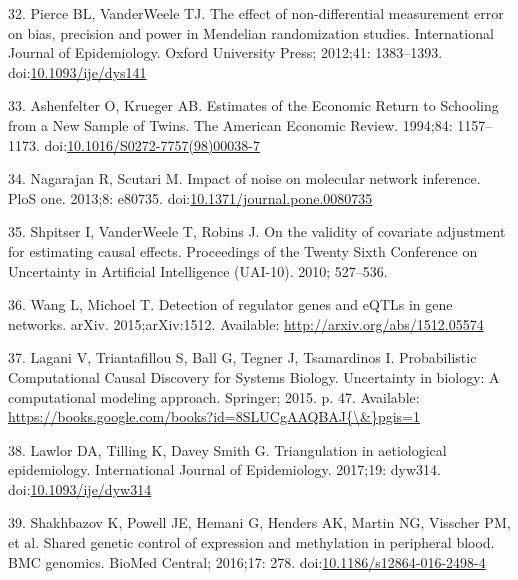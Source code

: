 \documentclass[]{article}
\begin{document}
\leavevmode\hypertarget{ref-Pierce2012}{}%
32. Pierce BL, VanderWeele TJ. The effect of non-differential
measurement error on bias, precision and power in Mendelian
randomization studies. International Journal of Epidemiology. Oxford
University Press; 2012;41: 1383--1393.
doi:\href{https://doi.org/10.1093/ije/dys141}{10.1093/ije/dys141}

\leavevmode\hypertarget{ref-Ashenfelter1994}{}%
33. Ashenfelter O, Krueger AB. Estimates of the Economic Return to
Schooling from a New Sample of Twins. The American Economic Review.
1994;84: 1157--1173.
doi:\href{https://doi.org/10.1016/S0272-7757(98)00038-7}{10.1016/S0272-7757(98)00038-7}

\leavevmode\hypertarget{ref-Nagarajan2013}{}%
34. Nagarajan R, Scutari M. Impact of noise on molecular network
inference. PloS one. 2013;8: e80735.
doi:\href{https://doi.org/10.1371/journal.pone.0080735}{10.1371/journal.pone.0080735}

\leavevmode\hypertarget{ref-Shpitser2010}{}%
35. Shpitser I, VanderWeele T, Robins J. On the validity of covariate
adjustment for estimating causal effects. Proceedings of the Twenty
Sixth Conference on Uncertainty in Artificial Intelligence (UAI-10).
2010; 527--536.

\leavevmode\hypertarget{ref-Wang2015}{}%
36. Wang L, Michoel T. Detection of regulator genes and eQTLs in gene
networks. arXiv. 2015;arXiv:1512. Available:
\url{http://arxiv.org/abs/1512.05574}

\leavevmode\hypertarget{ref-Lagani2015}{}%
37. Lagani V, Triantafillou S, Ball G, Tegner J, Tsamardinos I.
Probabilistic Computational Causal Discovery for Systems Biology.
Uncertainty in biology: A computational modeling approach. Springer;
2015. p. 47. Available:
\href{https://books.google.com/books?id=8SLUCgAAQBAJ\%7B/\&\%7Dpgis=1}{https://books.google.com/books?id=8SLUCgAAQBAJ\{\textbackslash{}\&\}pgis=1}

\leavevmode\hypertarget{ref-Lawlor2017}{}%
38. Lawlor DA, Tilling K, Davey Smith G. Triangulation in aetiological
epidemiology. International Journal of Epidemiology. 2017;19: dyw314.
doi:\href{https://doi.org/10.1093/ije/dyw314}{10.1093/ije/dyw314}

\leavevmode\hypertarget{ref-Shakhbazov2016}{}%
39. Shakhbazov K, Powell JE, Hemani G, Henders AK, Martin NG, Visscher
PM, et al. Shared genetic control of expression and methylation in
peripheral blood. BMC genomics. BioMed Central; 2016;17: 278.
doi:\href{https://doi.org/10.1186/s12864-016-2498-4}{10.1186/s12864-016-2498-4}
\end{document}
